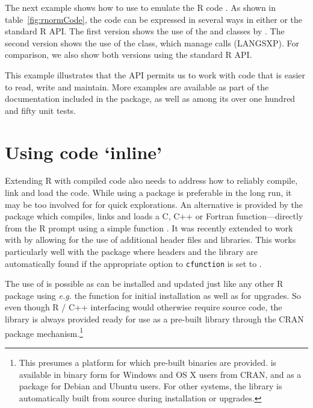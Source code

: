 The next example shows how to use  to emulate the R code
.
%
As shown in table~\ref{fig:rnormCode}, the code can be expressed in several
ways in either  or the standard R API. The first version shows the
use of the  and  classes by
.
The second version shows the use of the  class, which 
manage calls (LANGSXP). 
For comparison, we also show both versions using the standard R API.

This example illustrates that the  API permits us to work with code
that is easier to read, write and maintain. More examples are available as
part of the documentation included in the  package, as well as
among its over one hundred and fifty unit tests.


\section{Using code `inline'}
\label{sec:inline}

Extending R with compiled code also needs to address how to reliably compile,
link and load the code.  While using a package is preferable in the long run,
it may be too involved for for quick explorations. An alternative is
provided by the  package \citep{cran:inline} which compiles,
links and loads a C, C++ or Fortran function---directly from the R prompt
using a simple function .  It was recently extended to work
with  by allowing for the use of additional header files and
libraries. This works particularly well with the  package where
headers and the library are automatically found if the appropriate option
 to \texttt{cfunction} is set to .

The use of  is possible as  can be installed and
updated just like any other R package using \textsl{e.g.} the
 function for initial installation as well as
 for upgrades.  So even though R / C++ interfacing
would otherwise require source code, the  library is always provided
ready for use as a pre-built library through the CRAN package
mechanism.\footnote{This presumes a platform for which pre-built binaries are
  provided.  is available in binary form for Windows and OS X users from
  CRAN, and as a  package for Debian and Ubuntu users. For other systems, the
   library is automatically built from source during installation
  or upgrades.}

